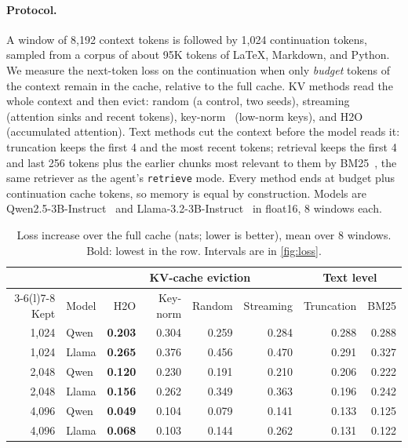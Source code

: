 \documentclass[11pt]{article}
\newcommand{\code}[1]{\texttt{#1}}
\begin{document}
\paragraph{Protocol.}
A window of 8,192 context tokens is followed by 1,024 continuation tokens, sampled from a corpus of about 95K tokens of LaTeX, Markdown, and Python. We measure the next-token loss on the continuation when only \emph{budget} tokens of the context remain in the cache, relative to the full cache. KV methods read the whole context and then evict: random (a control, two seeds), streaming~\citep{xiao2024streamingllm} (attention sinks and recent tokens), key-norm~\citep{devoto2024l2norm} (low-norm keys), and H2O~\citep{zhang2023h2o} (accumulated attention). Text methods cut the context before the model reads it: truncation keeps the first 4 and the most recent tokens; retrieval keeps the first 4 and last 256 tokens plus the earlier chunks most relevant to them by BM25~\citep{robertson2009bm25}, the same retriever as the agent's \code{retrieve} mode. Every method ends at budget plus continuation cache tokens, so memory is equal by construction. Models are Qwen2.5-3B-Instruct~\citep{qwen2024qwen25} and Llama-3.2-3B-Instruct~\citep{grattafiori2024llama3} in float16, 8 windows each.

\begin{table}[t]
\centering
\small
\caption{Loss increase over the full cache (nats; lower is better), mean over 8 windows. Bold: lowest in the row. Intervals are in \cref{fig:loss}.}
\label{tab:memory}
\begin{tabular}{@{}r l r r r r r r@{}}
\toprule
& & \multicolumn{4}{c}{KV-cache eviction} & \multicolumn{2}{c}{Text level} \\
\cmidrule(lr){3-6}\cmidrule(l){7-8}
Kept & Model & H2O & Key-norm & Random & Streaming & Truncation & BM25 \\
\midrule
1,024 & Qwen & \textbf{0.203} & 0.304 & 0.259 & 0.284 & 0.288 & 0.288 \\
1,024 & Llama & \textbf{0.265} & 0.376 & 0.456 & 0.470 & 0.291 & 0.327 \\
2,048 & Qwen & \textbf{0.120} & 0.230 & 0.191 & 0.210 & 0.206 & 0.222 \\
2,048 & Llama & \textbf{0.156} & 0.262 & 0.349 & 0.363 & 0.196 & 0.242 \\
4,096 & Qwen & \textbf{0.049} & 0.104 & 0.079 & 0.141 & 0.133 & 0.125 \\
4,096 & Llama & \textbf{0.068} & 0.103 & 0.144 & 0.262 & 0.131 & 0.122 \\
\bottomrule
\end{tabular}
\end{table}
\end{document}
